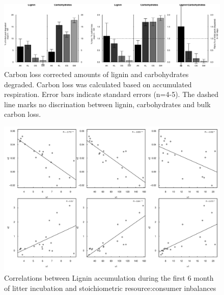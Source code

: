 \documentclass[authoryear,preprint,review,12pt]{elsarticle}
\begin{document}
\newpage
\begin{figure}[h!]
\vspace*{2mm}
\begin{center}
\includegraphics{sbb-degrdiff}
\end{center}
\caption{Carbon loss corrected amounts of lignin and carbohydrates degraded. Carbon loss was calculated based on accumulated respiration. Error bars indicate standard errors (n=4-5). The dashed line marks no discrination between lignin, carbohydrates and bulk carbon loss.}
\label{fig:degr}
\end{figure}

\newpage
\begin{figure}[h!]
\vspace*{2mm}
\begin{center}
\includegraphics{sbb-graphcorr}
\end{center}
\caption{Correlations between Lignin accumulation during the first 6 month of litter incubation and stoichiometric resource:consumer inbalances}
\label{fig:cor1}
\end{figure}
\end{document}

